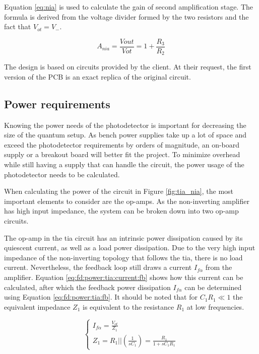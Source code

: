 Equation \eqref{eq:nia} is used to calculate the gain of second amplification stage. The formula is derived from the voltage divider formed by the two resistors and the fact that $V_{ot} = V_{-}$.

\begin{equation}\label{eq:nia}
	A_{nia} = \frac{V{out}}{V{ot}} = 1 + \frac{R_3}{R_2}
\end{equation}

The design is based on circuits provided by the client. At their request, the first version of the PCB is an exact replica of the original circuit.  

\subsection{Power requirements}\label{chap:fd:power_req}
Knowing the power needs of the photodetector is important for decreasing the size of the quantum setup. As bench power supplies take up a lot of space and exceed the photodetector requirements by orders of magnitude, an on-board supply or a breakout board will better fit the project. To minimize overhead while still having a supply that can handle the circuit, the power usage of the photodetector needs to be calculated. 

When calculating the power of the circuit in Figure \ref{fig:tia_nia}, the most important elements to consider are the op-amps. As the non-inverting amplifier has high input impedance, the system can be broken down into two op-amp circuits.

The op-amp in the \gls{tia} circuit has an intrinsic power dissipation caused by its quiescent current, as well as a load power dissipation. Due to the very high input impedance of the non-inverting topology that follows the \gls{tia}, there is no load current. Nevertheless, the feedback loop still draws a current $I_{f\alpha}$ from the amplifier. Equation \eqref{eq:fd:power:tia:current:fb} shows how this current can be calculated, after which the feedback power dissipation $I_{f\alpha}$ can be determined using Equation \eqref{eq:fd:power:tia:fb}. It should be noted that for $C_1R_1 \ll 1$ the equivalent impedance $Z_1$ is equivalent to the resistance $R_1$ at low frequencies.

\begin{equation}\label{eq:fd:power:tia:current:fb}
	\begin{cases}
		I_{f\alpha} = \frac{V_{ot}}{Z_1}\\
		Z_1 = R_1||(\frac{1}{sC_1}) = \frac{R_1}{1 + sC_1R_1}
	\end{cases}
\end{equation}

